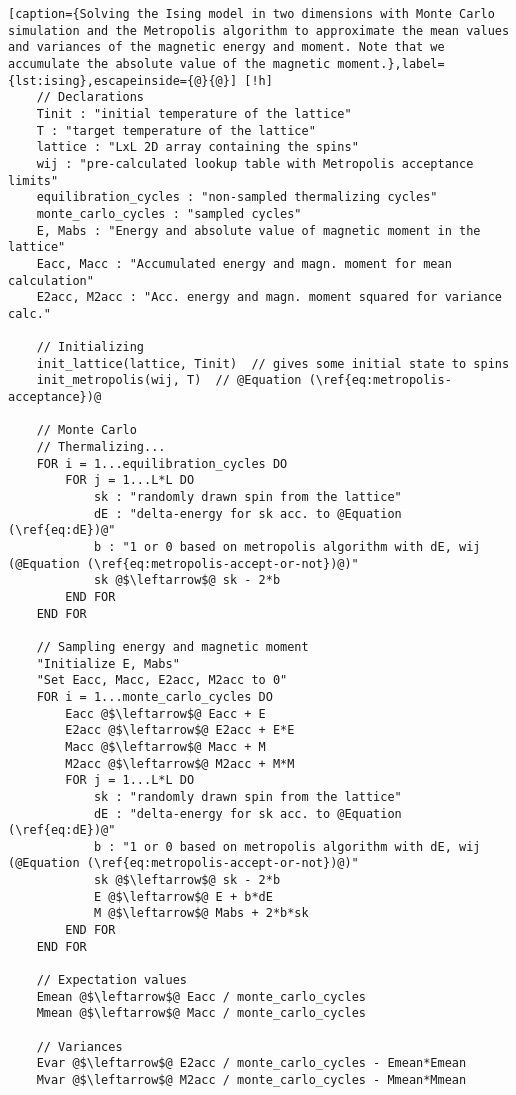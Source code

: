 \documentclass[]{article}
\begin{document}
\begin{lstlisting}[caption={Solving the Ising model in two dimensions with Monte Carlo simulation and the Metropolis algorithm to approximate the mean values and variances of the magnetic energy and moment. Note that we accumulate the absolute value of the magnetic moment.},label={lst:ising},escapeinside={@}{@}] [!h]
	// Declarations
	Tinit : "initial temperature of the lattice"
	T : "target temperature of the lattice"	
	lattice : "LxL 2D array containing the spins"
	wij : "pre-calculated lookup table with Metropolis acceptance limits"
	equilibration_cycles : "non-sampled thermalizing cycles"
	monte_carlo_cycles : "sampled cycles"
	E, Mabs : "Energy and absolute value of magnetic moment in the lattice"
	Eacc, Macc : "Accumulated energy and magn. moment for mean calculation"
	E2acc, M2acc : "Acc. energy and magn. moment squared for variance calc."
	
	// Initializing
	init_lattice(lattice, Tinit)  // gives some initial state to spins
	init_metropolis(wij, T)  // @Equation (\ref{eq:metropolis-acceptance})@
	
	// Monte Carlo
	// Thermalizing...
	FOR i = 1...equilibration_cycles DO
		FOR j = 1...L*L DO
			sk : "randomly drawn spin from the lattice"
			dE : "delta-energy for sk acc. to @Equation (\ref{eq:dE})@"
			b : "1 or 0 based on metropolis algorithm with dE, wij (@Equation (\ref{eq:metropolis-accept-or-not})@)"
			sk @$\leftarrow$@ sk - 2*b
		END FOR
	END FOR
	
	// Sampling energy and magnetic moment
	"Initialize E, Mabs"
	"Set Eacc, Macc, E2acc, M2acc to 0"
	FOR i = 1...monte_carlo_cycles DO
		Eacc @$\leftarrow$@ Eacc + E
		E2acc @$\leftarrow$@ E2acc + E*E
		Macc @$\leftarrow$@ Macc + M
		M2acc @$\leftarrow$@ M2acc + M*M		
		FOR j = 1...L*L DO
			sk : "randomly drawn spin from the lattice"
			dE : "delta-energy for sk acc. to @Equation (\ref{eq:dE})@"
			b : "1 or 0 based on metropolis algorithm with dE, wij (@Equation (\ref{eq:metropolis-accept-or-not})@)"
			sk @$\leftarrow$@ sk - 2*b
			E @$\leftarrow$@ E + b*dE
			M @$\leftarrow$@ Mabs + 2*b*sk
		END FOR
	END FOR	
	
	// Expectation values
	Emean @$\leftarrow$@ Eacc / monte_carlo_cycles
	Mmean @$\leftarrow$@ Macc / monte_carlo_cycles

	// Variances
	Evar @$\leftarrow$@ E2acc / monte_carlo_cycles - Emean*Emean
	Mvar @$\leftarrow$@ M2acc / monte_carlo_cycles - Mmean*Mmean	
\end{lstlisting}
\end{document}
